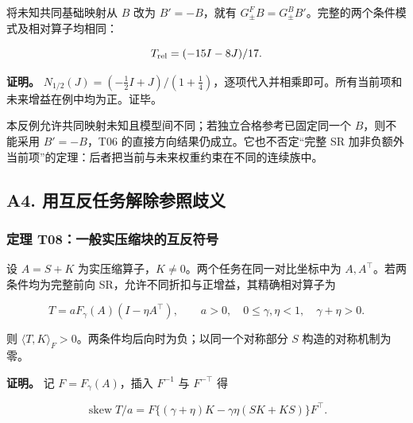 \documentclass[11pt,a4paper]{article}
\begin{document}
\par
\noindent\begin{minipage}{\linewidth}

将未知共同基础映射从 \(B\) 改为 \(B'=-B\)，就有
\(G^F_\pm B=G^B_\pm B'\)。完整的两个条件模式及相对算子均相同：

\[
T_{\rm rel}=(-15I-8J)/17.
\]

\end{minipage}\par

\textbf{证明。}
\(N_{1/2}(J)=(-\tfrac12I+J)/(1+\tfrac14)\)，逐项代入并相乘即可。所有当前项和未来增益在例中均为正。证毕。

本反例允许共同映射未知且模型间不同；若独立合格参考已固定同一个
\(B\)，则不能采用 \(B'=-B\)，T06 的直接方向结果仍成立。它也不否定“完整
SR 加非负额外当前项”的定理：后者把当前与未来权重约束在不同的连续族中。

\subsection{A4.
用互反任务解除参照歧义}\label{a4.-ux7528ux4e92ux53cdux4efbux52a1ux89e3ux9664ux53c2ux7167ux6b67ux4e49}

\subsubsection{定理
T08：一般实压缩块的互反符号}\label{ux5b9aux7406-t08ux4e00ux822cux5b9eux538bux7f29ux5757ux7684ux4e92ux53cdux7b26ux53f7}

\par
\noindent\begin{minipage}{\linewidth}

设 \(A=S+K\) 为实压缩算子，\(K\ne0\)。两个任务在同一对比坐标中为
\(A,A^\top\)。若两条件均为完整前向
SR，允许不同折扣与正增益，其精确相对算子为

\[
T=aF_\gamma(A)(I-\eta A^\top),
\qquad a>0,\quad0\le\gamma,\eta<1,\quad\gamma+\eta>0.
\]

\end{minipage}\par

则 \(\langle T,K\rangle_F>0\)。两条件均后向时为负；以同一个对称部分
\(S\) 构造的对称机制为零。

\par
\noindent\begin{minipage}{\linewidth}

\textbf{证明。} 记 \(F=F_\gamma(A)\)，插入 \(F^{-1}\) 与 \(F^{-\top}\)
得

\[
\operatorname{skew}T/a
=F\{(\gamma+\eta)K-\gamma\eta(SK+KS)\}F^\top.
\]

\end{minipage}\par
\end{document}
